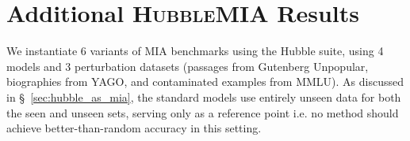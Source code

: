 \documentclass{article} %
\begin{document}
\newpage
\section{Additional \textsc{HubbleMIA} Results}
\label{app:mia_results}

We instantiate 6 variants of MIA benchmarks using the Hubble suite, using 4 models and 3 perturbation datasets (passages from Gutenberg Unpopular, biographies from YAGO, and contaminated examples from MMLU). As discussed in \S~\ref{sec:hubble_as_mia}, the standard models use entirely unseen data for both the seen and unseen sets, serving only as a reference point i.e. no method should achieve better-than-random accuracy in this setting.


% 
\end{document}
